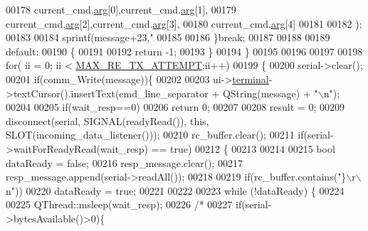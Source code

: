 \begin{DoxyCode}
{{{{{{{{{{{{{{00178                                     current\_cmd.\hyperlink{a00004_a56e6c2d7315d0ae60a51e8b140c9cfe4}{arg}[0],current\_cmd.\hyperlink{a00004_a56e6c2d7315d0ae60a51e8b140c9cfe4}{arg}[1],
00179                                     current\_cmd.\hyperlink{a00004_a56e6c2d7315d0ae60a51e8b140c9cfe4}{arg}[2],current\_cmd.\hyperlink{a00004_a56e6c2d7315d0ae60a51e8b140c9cfe4}{arg}[3],
00180                                     current\_cmd.\hyperlink{a00004_a56e6c2d7315d0ae60a51e8b140c9cfe4}{arg}[4]
00181 
00182                                     );
00183 
00184        sprintf(message+23,\textcolor{stringliteral}{"%
00185 
00186        \}\textcolor{keywordflow}{break};
00187 
00188 
00189        \textcolor{keywordflow}{default}:
00190        \{
00191 
00192            \textcolor{keywordflow}{return} -1;
00193        \}
00194    \}
00195 
00196 
00197 
00198    \textcolor{keywordflow}{for}( ii = 0; ii < \hyperlink{a00090_ae024113875b4670b57f70611ff982543}{MAX\_RE\_TX\_ATTEMPT};ii++)
00199    \{
00200       serial->clear();
00201       \textcolor{keywordflow}{if}(comm\_Write(message))\{
00202 
00203           ui->\hyperlink{a00080_aae71c46ea4546df5994735dee573b2dd}{terminal}->textCursor().insertText(cmd\_line\_separator + QString(message) + \textcolor{stringliteral}{"\(\backslash\)n"});
00204 
00205           \textcolor{keywordflow}{if}(wait\_resp==0)
00206               \textcolor{keywordflow}{return} 0;
00207 
00208           result = 0;
00209           disconnect(serial, SIGNAL(readyRead()), \textcolor{keyword}{this}, SLOT(incoming\_data\_listener()));
00210               rc\_buffer.clear();
00211               \textcolor{keywordflow}{if}(serial->waitForReadyRead(wait\_resp) == \textcolor{keyword}{true})
00212               \{
00213 
00214 
00215                      \textcolor{keywordtype}{bool} dataReady = \textcolor{keyword}{false};
00216                      resp\_message.clear();
00217                      resp\_message.append(serial->readAll());
00218 
00219                      \textcolor{keywordflow}{if}(rc\_buffer.contains(\textcolor{stringliteral}{"\}\(\backslash\)r\(\backslash\)n"}))
00220                          dataReady = \textcolor{keyword}{true};
00221 
00222 
00223                    \textcolor{keywordflow}{while} (!dataReady) \{
00224 
00225                        QThread::msleep(wait\_resp);
00226                        \textcolor{comment}{/*}
00227 \textcolor{comment}{                       if(serial->bytesAvailable()>0)\{}
}}}}}}}}}}}}}}}
\end{DoxyCode}
